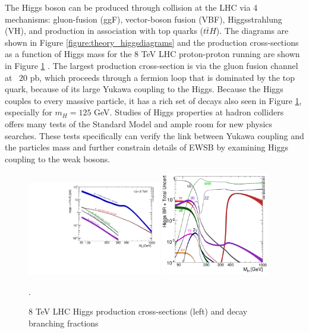 The Higgs boson can be produced through collision at the LHC
via 4 mechanisms: gluon-fusion (ggF), vector-boson fusion (VBF), 
Higgsstrahlung (VH), and production in association with top quarks ($t\bar{t}H$). The diagrams
are shown in Figure \ref{figure:theory_higgsdiagrams} and the production
cross-sections as a function of Higgs mass for the 8 TeV LHC proton-proton
running are shown in Figure \ref{figure:theory_xsec} \cite{Dittmaier:2012vm}. The largest production
cross-section is via the gluon fusion channel at ~$20$ pb, which proceeds
through a fermion loop that is dominated by the top quark, because of its
large Yukawa coupling to the Higgs. Because the Higgs couples to every massive
particle, it has a rich set of decays also seen in Figure
\ref{figure:theory_xsec}, especially for $m_H=125$ GeV.  Studies of Higgs
properties at hadron colliders offers many tests of the Standard Model
and ample room for new physics searches. These
tests specifically can verify the link between Yukawa coupling and the
particles mass and further constrain details of EWSB by examining Higgs coupling
to the weak bosons. 

\begin{figure}[!t]
\centering 
\includegraphics[width=0.52\textwidth]{figs/theory/Higgs_XS_8TeV_lx.pdf}
\includegraphics[width=0.42\textwidth]{figs/theory/Higgs_BR.pdf}
\caption {8 TeV LHC Higgs production cross-sections (left) and decay branching fractions }.
\label{figure:theory_xsec}
\end{figure}


